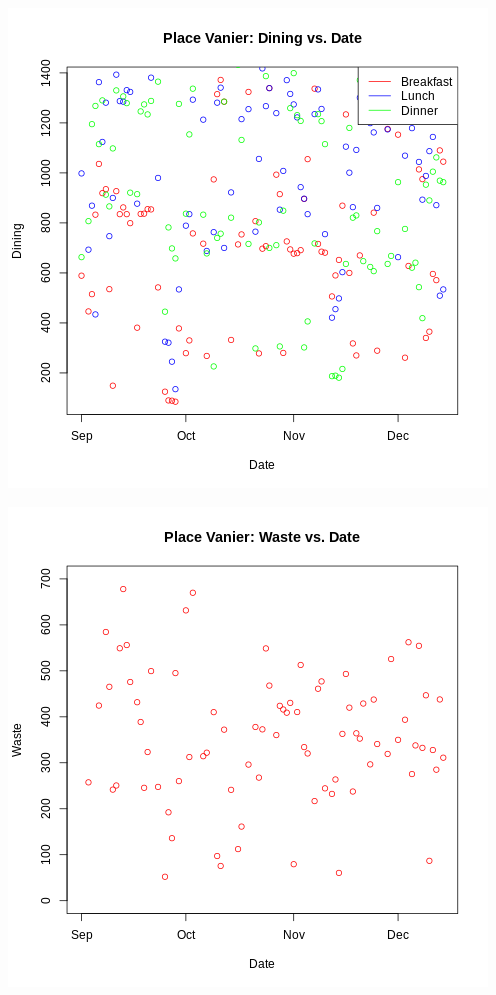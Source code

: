 \begin{center}
    \includegraphics[scale = 0.575]{graph_table/PV_dining.png}
\end{center}

\begin{center}
    \includegraphics[scale = 0.575]{graph_table/PV_waste.png}
\end{center}